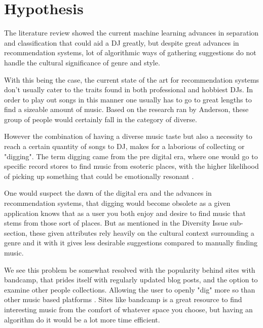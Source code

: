 
\graphicspath{{Chapter4/}}

\chapter{Hypothesis}

The literature review showed the current machine learning advances in separation and classification that could aid a DJ greatly, but despite great advances in recommendation systems, lot of algorithmic ways of gathering suggestions do not handle the cultural significance of genre and style.

With this being the case, the current state of the art for recommendation systems don't usually cater to the traits found in both professional and hobbiest DJs. In order to play out songs in this manner one usually has to go to great lengths to find a sizeable amount of music. Based on the research ran by Anderson, these group of people would certainly fall in the category of diverse.

However the combination of having a diverse music taste but also a necessity to reach a certain quantity of songs to DJ, makes for a laborious of collecting or "digging". The term digging came from the pre digital era, where one would go to specific record stores to find music from esoteric places, with the higher likelihood of picking up something that could be emotionally resonant \citep{allen_djs_2021}.

One would suspect the dawn of the digital era and the advances in recommendation systems, that digging would become obsolete as a given application knows that as a user you both enjoy and desire to find music that stems from those sort of places. But as mentioned in the Diversity Issue sub-section, these given attributes rely heavily on the cultural context surrounding a genre and it with it gives less desirable suggestions compared to manually finding music. 

We see this problem be somewhat resolved with the popularity behind sites with bandcamp, that prides itself with regularly updated blog posts, and the option to examine other people collections. Allowing the user to openly "dig" more so than other music based platforms \citep{bandcamp_about_2023}.  Sites like bandcamp is a great resource to find interesting music from the comfort of whatever space you choose, but having an algorithm do it would be a lot more time efficient.

